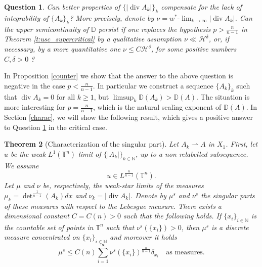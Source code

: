 \documentclass[10pt,reqno]{amsart}
\numberwithin{equation}{section}
\newcommand{\T}{\mathbb{T}}
\newcommand{\N}{\mathbb{N}}
\newcommand{\D}{\mathbb{D}}
\DeclareMathOperator{\dv}{div}
\theoremstyle{plain}
\newtheorem{Teo}{Theorem}[section]
\newtheorem{QUE}[Teo]{Question}
\theoremstyle{definition}
\theoremstyle{remark}
\begin{document}
\begin{QUE}\label{QUES} Can better properties of $\{|\dv A_k|\}_{k}$ compensate for the lack of integrability of $\{A_k\}_k$? More precisely, denote by $\nu= w^*\text{-}\lim_{k\rightarrow \infty}|\dv A_k|$. Can the upper semicontinuity of $\D$ persist if one replaces the hypothesis $p>\frac{n}{n-1}$ in Theorem \ref{t:usc_supercritical} by a qualitative assumption $\nu \ll \mathcal{H}^\delta$, or, if necessary, by a more quantitative one $\nu \leq C \mathcal{H}^\delta $, for some positive numbers $C,\delta>0$ ?
\end{QUE}
In Proposition \ref{counter}  we show that the answer to the above question is negative in the case $p<\frac{n}{n-1}$. In particular we construct a sequence $\{A_k\}_k$ such that $\dv A_k=0$ for all $k\geq 1$, but $\limsup_k \D(A_k)>\D(A)$. The situation is more interesting for $p = \frac{n}{n-1}$, which is the natural scaling exponent of $\D(A)$. In Section \ref{charac}, we will show the following result, which gives a positive answer to Question \ref{QUES} in the critical case.
\begin{Teo}[Characterization of the singular part]\label{intro:charact_singular_part}
Let $A_k \rightharpoonup A$ in $X_{1}$. First, let $u$ be the weak $L^1(\T^n)$ limit of $\{|A_k|\}_{k \in \N}$, up to a non relabelled subsequence. We assume 
\begin{equation}\label{morereglim}
u \in L^\frac{n}{n-1}(\T^n).
\end{equation}
Let $\mu$ and $\nu$ be, respectively, the weak-star limits of the measures $\mu_k = \det^\frac{1}{n-1}(A_k)dx$ and $\nu_k = |\dv A_k|$. Denote by $\mu^s$ and $\nu^s$ the singular parts of these measures with respect to the Lebesgue measure. There exists a dimensional constant $C= C(n) > 0$ such that the following holds. If $\{x_i\}_{i\in \N}$ is the countable set  of points in $\T^n$ such that $\nu^s(\{x_i\}) > 0$, then $\mu^s$ is a discrete measure concentrated on $\{x_i\}_{i\in \N}$ and moreover it holds
\begin{equation}\label{bound_singular_concentration}
\mu^s\leq C(n) \sum_{i=1}^\infty \nu^s(\{x_i\})^\frac{n}{n-1}\delta_{x_i}\quad \text{as measures}.
\end{equation}
\end{Teo}
\end{document}
